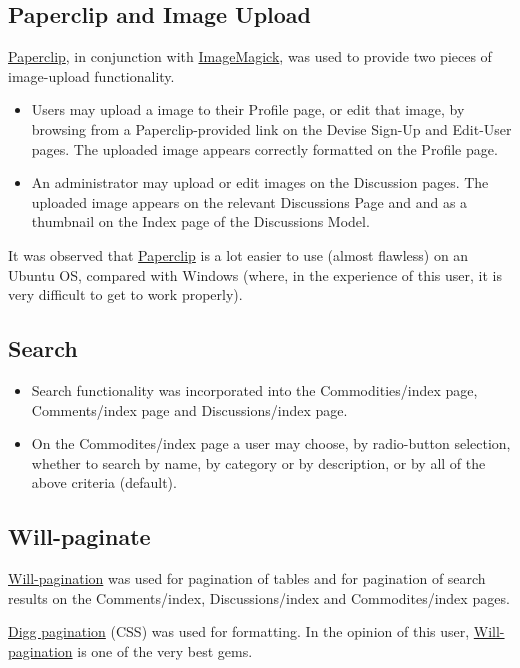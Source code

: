 \documentclass[11pt]{article}
\begin{document}
\subsection{Paperclip and Image Upload}
\href{http://rubygems.org/gems/paperclip}{Paperclip}, 
in conjunction with 
\href{http://www.imagemagick.org/script/index.php}{ImageMagick}, 
was used to
provide two pieces of image-upload functionality.
\begin{itemize}
\item[] Users may upload a image to their Profile page, or
edit that image, by browsing from a Paperclip-provided link  
on the Devise Sign-Up and Edit-User pages.
The uploaded image appears correctly formatted on the Profile page.
\item[] An administrator may upload or edit images on the Discussion
pages. The uploaded image appears on the relevant Discussions Page and and as
a thumbnail on the Index page of the Discussions Model.
\end{itemize}
It was observed that \href{http://rubygems.org/gems/paperclip}{Paperclip}  is a lot easier to use (almost flawless)
on an Ubuntu OS, 
compared with Windows (where, in the experience of this
user, it is very difficult to get to work properly). 
\subsection{Search}
\begin{itemize}
\item[] Search functionality was incorporated into the 
Commodities/index page,
Comments/index page and
Discussions/index page.


\item[] On the Commodites/index page
a user may choose,
by radio-button selection,
whether to search by name,
by category or by description,
or by all of the above criteria (default). 

\end{itemize}
\subsection{Will-paginate}

\href{https://github.com/mislav/will_paginate/wiki}{Will-pagination} was used for pagination of tables 
and for pagination of search results on the Comments/index, Discussions/index and Commodites/index pages.

\href{http://mislav.uniqpath.com/will_paginate/}{Digg pagination} (CSS) was used for formatting. 
In the opinion of this user, \href{https://github.com/mislav/will_paginate/wiki}{Will-pagination} is one of
the very best gems. 
\end{document}
